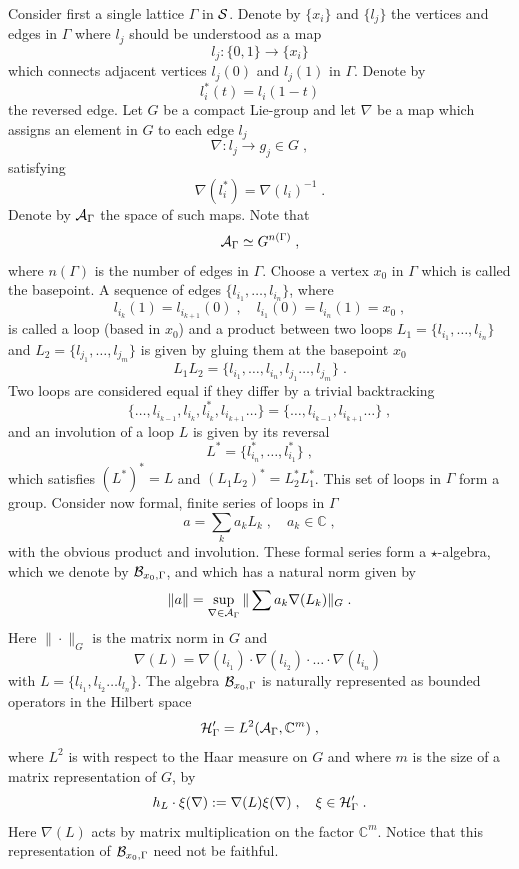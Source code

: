 \documentclass[12pt]{article}
\def\G{\Gamma}
\def\ca{{\cal A}}
\def\cb{{\cal B}}
\def\ch{{\cal H}}
\def\cs{{\cal S}}
\begin{document}
Consider first a single lattice $\G$ in $\cs$. Denote by $\{x_i\}$ and $\{l_j\}$ the vertices and edges in $\G$ where $l_j$ should be understood as a map
$$
l_j:\{0,1\}\rightarrow \{x_i\}
$$
which connects adjacent vertices $l_j(0)$ and $l_j(1)$ in $\G$. Denote by 
$$l_i^*(t)=l_i(1-t)
$$
the reversed edge.
 Let $G$ be a compact Lie-group and let $\nabla$ be a map which assigns an element in $G$ to each edge $l_j$
$$
\nabla: l_j\rightarrow   g_j \in G \;,
$$
satisfying
$$
\nabla(l_i^*)=\nabla(l_i)^{-1}\;.
$$
Denote by $\ca_{\G}$ the space of such maps. Note that 
$$
\ca_{\G}\simeq G^{n(\G)}\;,
$$
where $n(\G)$ is the number of edges in $\G$. Choose a vertex $x_0$ in $\G$ which is called the basepoint. 
A sequence of edges $\{l_{i_1},\ldots,l_{i_n}\}$, where 
$$
l_{i_k}(1)= l_{i_{k+1}}(0)\;,\quad   l_{i_1}(0)=l_{i_n}(1)=x_0\;,
$$ 
is called a loop (based in $x_0$) and a product between two loops $L_1=\{l_{i_1},\ldots,l_{i_n}\}$ and $L_2=\{l_{j_1},\ldots,l_{j_m}\}$ is given by gluing them at the basepoint $x_0$
$$
L_1 L_2 =\{l_{i_1},\ldots,l_{i_n},l_{j_1}\ldots,l_{j_m}\}\;.
$$
Two loops are considered equal if they differ by a trivial backtracking
$$
\{\ldots,l_{i_{k-1}}, l_{i_k},l_{i_k}^*,l_{i_{k+1}}\ldots\} = \{\ldots,l_{i_{k-1}}, l_{i_{k+1}}\ldots \}\;,
$$
and an involution of a loop $L$ is given by its reversal 
$$
L^* = \{l^*_{i_n},\ldots,l_{i_1}^*\}\;,
$$
which satisfies $(L^*)^*=L$ and $(L_1 L_2)^* = L_2^*  L_1^*$.
This set of loops in $\G$ form a group. Consider now formal, finite series of loops in $\G$
$$
a = \sum_k a_k L_k\;,\quad a_k\in\mathbb{C}\;,
$$
with the obvious product and involution. These formal series form a $\star$-algebra, which we denote by $\cb_{x_0,\G}$, and which has a natural norm given by
\[
\| a \|= \sup_{\nabla\in\ca_{\G}}\|\sum a_k \nabla(L_k)  \|_G\;.
\]
Here $\|\cdot \|_G$ is the matrix norm in $G$ and 
\[
\nabla(L)= \nabla({l_{i_1}})\cdot\nabla(l_{i_2})\cdot\ldots\cdot\nabla(l_{i_n})\;
\]
with $ L=\{  l_{i_1},l_{i_2}\ldots l_{l_n}  \}$.
The algebra $\cb_{x_0,\G}$ is naturally represented as bounded operators in the Hilbert space
$$
\ch'_\G =L^2(\ca_{\G},\mathbb{C}^m)\;,
$$
where $L^2$ is with respect to the Haar measure on $G$ and where $m$ is the size of a matrix representation of $G$, by
\begin{equation}
h_L\cdot \xi(\nabla) := \nabla(L) \xi(\nabla)\;,\quad \xi \in  \ch'_{\G}\;.
\label{representation}
\end{equation}
Here $\nabla(L)$ acts by matrix multiplication on the factor $\mathbb{C}^m$. 
Notice that this representation of $\cb_{x_0,\G}$ need not be faithful.
\end{document}
